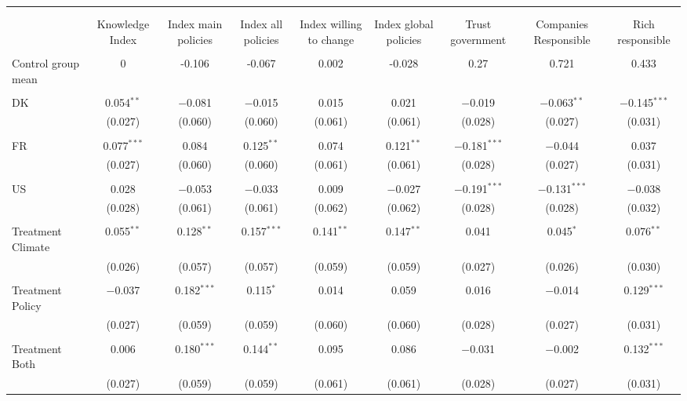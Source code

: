 
\begin{tabular}{@{\extracolsep{5pt}}lcccccccc} 
\\[-1.8ex]\hline 
\hline \\[-1.8ex] 
\\[-1.8ex] & Knowledge Index & Index main policies & Index all policies & Index willing to change & Index global policies & Trust government & Companies Responsible & Rich responsible \\ 
\hline \\[-1.8ex] 
 Control group mean & 0 & -0.106 & -0.067 & 0.002 & -0.028 & 0.27 & 0.721 & 0.433  \\ \hline \\[-1.8ex] DK & 0.054$^{**}$ & $-$0.081 & $-$0.015 & 0.015 & 0.021 & $-$0.019 & $-$0.063$^{**}$ & $-$0.145$^{***}$ \\ 
  & (0.027) & (0.060) & (0.060) & (0.061) & (0.061) & (0.028) & (0.027) & (0.031) \\ 
  & & & & & & & & \\ 
 FR & 0.077$^{***}$ & 0.084 & 0.125$^{**}$ & 0.074 & 0.121$^{**}$ & $-$0.181$^{***}$ & $-$0.044 & 0.037 \\ 
  & (0.027) & (0.060) & (0.060) & (0.061) & (0.061) & (0.028) & (0.027) & (0.031) \\ 
  & & & & & & & & \\ 
 US & 0.028 & $-$0.053 & $-$0.033 & 0.009 & $-$0.027 & $-$0.191$^{***}$ & $-$0.131$^{***}$ & $-$0.038 \\ 
  & (0.028) & (0.061) & (0.061) & (0.062) & (0.062) & (0.028) & (0.028) & (0.032) \\ 
  & & & & & & & & \\ 
 Treatment Climate & 0.055$^{**}$ & 0.128$^{**}$ & 0.157$^{***}$ & 0.141$^{**}$ & 0.147$^{**}$ & 0.041 & 0.045$^{*}$ & 0.076$^{**}$ \\ 
  & (0.026) & (0.057) & (0.057) & (0.059) & (0.059) & (0.027) & (0.026) & (0.030) \\ 
  & & & & & & & & \\ 
 Treatment Policy & $-$0.037 & 0.182$^{***}$ & 0.115$^{*}$ & 0.014 & 0.059 & 0.016 & $-$0.014 & 0.129$^{***}$ \\ 
  & (0.027) & (0.059) & (0.059) & (0.060) & (0.060) & (0.028) & (0.027) & (0.031) \\ 
  & & & & & & & & \\ 
 Treatment Both & 0.006 & 0.180$^{***}$ & 0.144$^{**}$ & 0.095 & 0.086 & $-$0.031 & $-$0.002 & 0.132$^{***}$ \\ 
  & (0.027) & (0.059) & (0.059) & (0.061) & (0.061) & (0.028) & (0.027) & (0.031) \\ 

\end{tabular}
